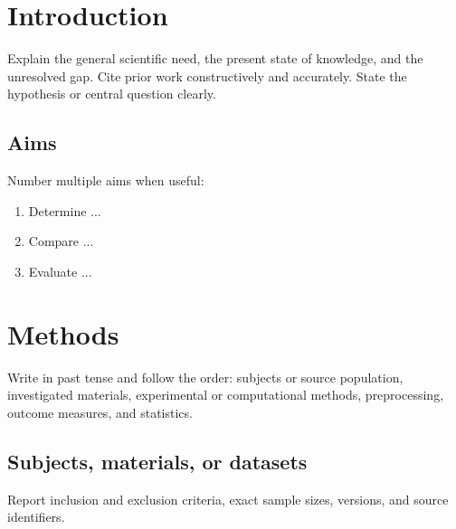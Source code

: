\documentclass[
  blockchain,
  computerscience,
  chemistry,
  biochemistry,
  biology
]{genesisl1-paper}
\begin{document}
\begin{GenesisFrontMatter}
  \begin{GenesisStructuredAbstract}
  \end{GenesisStructuredAbstract}
\end{GenesisFrontMatter}

\section{Introduction}
Explain the general scientific need, the present state of knowledge, and the unresolved
gap. Cite prior work constructively and accurately. State the hypothesis or central
question clearly.

\subsection{Aims}
Number multiple aims when useful:
\begin{enumerate}
  \item Determine ...
  \item Compare ...
  \item Evaluate ...
\end{enumerate}

\section{Methods}
Write in past tense and follow the order: subjects or source population, investigated
materials, experimental or computational methods, preprocessing, outcome measures,
and statistics.

\subsection{Subjects, materials, or datasets}
Report inclusion and exclusion criteria, exact sample sizes, versions, and source
identifiers.
\end{document}
